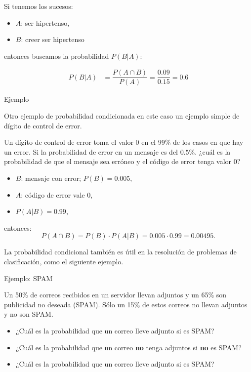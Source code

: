 \documentclass[
  letterpaper,
  DIV=11,
  numbers=noendperiod]{scrreprt}
\providecommand{\tightlist}{%
  \setlength{\itemsep}{0pt}\setlength{\parskip}{0pt}}\usepackage{longtable,booktabs,array}
\begin{document}
Si tenemos los sucesos:

\begin{itemize}
\tightlist
\item
  \(A\): ser hipertenso,
\item
  \(B\): creer ser hipertenso
\end{itemize}

entonces buscamos la probabilidad \(P(B|A)\):

\[
\begin{array}{rl}
P(B|A) & =\dfrac{P(A\cap B)}{P(A)}=\dfrac{0.09}{0.15}=
0.6
\end{array}
\]

Ejemplo

Otro ejemplo de probabilidad condicionada en este caso un ejemplo simple
de dígito de control de error.

Un dígito de control de error toma el valor 0 en el 99\% de los casos en
que hay un error. Si la probabilidad de error en un mensaje es del
\(0.5\%\). ¿cuál es la probabilidad de que el mensaje sea erróneo y el
código de error tenga valor 0?

\begin{itemize}
\tightlist
\item
  \(B\): mensaje con error; \(P(B)=0.005\),
\item
  \(A\): código de error vale 0,
\item
  \(P(A|B)=0.99\),
\end{itemize}

entonces: \[P(A\cap B)=P(B)\cdot P(A|B)=0.005\cdot 0.99=0.00495.\]

La probabilidad condicional también es útil en la resolución de
problemas de clasificación, como el siguiente ejemplo.

Ejemplo: SPAM

Un 50\% de correos recibidos en un servidor llevan adjuntos y un 65\%
son publicidad no deseada (SPAM). Sólo un 15\% de estos correos no
llevan adjuntos y no son SPAM.

\begin{itemize}
\tightlist
\item
  ¿Cuál es la probabilidad que un correo lleve adjunto si es SPAM?
\item
  ¿Cuál es la probabilidad que un correo \textbf{no} tenga adjuntos si
  \textbf{no} es SPAM?
\item
  ¿Cuál es la probabilidad que un correo lleve adjunto si es SPAM?
\end{itemize}
\end{document}
